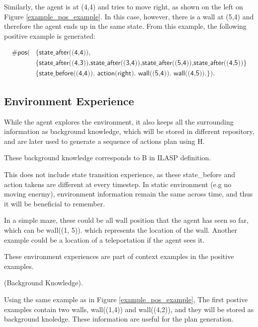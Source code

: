 \begin{examp}
Similarly, the agent is at (4,4) and tries to move right, as shown on the left on Figure \ref{example_pos_example}. In this case, however, there is a wall at (5,4) and therefore the agent ends up in the same state. From this example, the following positive example is generated:

\begin{equation}
\begin{split}
\textsf{\#pos(} & \textsf{\{state\_after((4,4))}, \\
                & \textsf{\{state\_after((4,3)),state\_after((3,4)),state\_after((5,4)),state\_after((4,5))\}} \\
                & \textsf{\{state\_before((4,4)). action(right). wall((5,4)). wall((4,5)).\}).}
\end{split}
\end{equation}

\end{examp}
\label{state_transition_example}

\subsection{Environment Experience}

While the agent explores the environment, it also keeps all the surrounding information as background knowledge,
which will be stored in different repository, and are later used to generate a sequence of actions plan using H.

These background knowledge corresponds to B in ILASP definition.

This does not include state transition experience, as these state\_before and action takens are different at every timestep.
In static environment (e.g no moving enermy), environment information remain the same across time, and thus it will be beneficial to remember.


In a simple maze, these could be all wall position that the agent has seen so far, which can be
wall((1, 5)). which represents the location of the wall.
Another example could be a location of a teleportation if the agent sees it.

These environment experiences are part of context examples in the positive examples.

\begin{examp} \normalfont (Background Knowledge).

Using the same example as in Figure \ref{example_pos_example},
The first postive examples contain two walls, wall((1,4)) and wall((4,2)), and they will be stored as background knoledge. These information are useful for the plan generation.
\end{examp}

